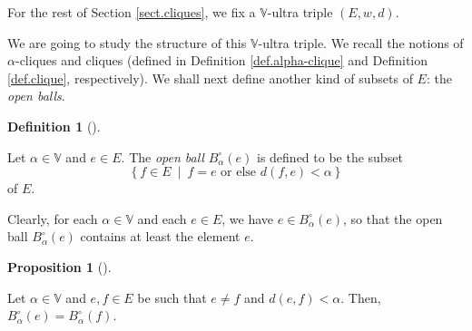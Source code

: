 \documentclass[numbers=enddot,12pt,final,onecolumn,notitlepage]{scrartcl}%
\theoremstyle{definition}
\newtheorem{prop}[theo]{Proposition}
\newenvironment{proposition}[1][]
{\begin{prop}[#1]\begin{leftbar}}
{\end{leftbar}\end{prop}}
\newtheorem{defi}[theo]{Definition}
\newenvironment{definition}[1][]
{\begin{defi}[#1]\begin{leftbar}}
{\end{leftbar}\end{defi}}
\theoremstyle{plainsl}
\begin{document}
For the rest of Section \ref{sect.cliques}, we fix a $\mathbb{V}$-ultra triple
$\left(  E,w,d\right)  $.

We are going to study the structure of this $\mathbb{V}$-ultra triple. We
recall the notions of $\alpha$-cliques and cliques (defined in Definition
\ref{def.alpha-clique} and Definition \ref{def.clique}, respectively). We
shall next define another kind of subsets of $E$: the \textit{open balls}.

\begin{definition}
\label{def.open-ball}Let $\alpha\in\mathbb{V}$ and $e\in E$. The \textit{open
ball }$B_{\alpha}^{\circ}\left(  e\right)  $ is defined to be the subset%
\[
\left\{  f\in E\ \mid\ f=e\text{ or else }d\left(  f,e\right)  <\alpha
\right\}
\]
of $E$.
\end{definition}

Clearly, for each $\alpha\in\mathbb{V}$ and each $e\in E$, we have $e\in
B_{\alpha}^{\circ}\left(  e\right)  $, so that the open ball $B_{\alpha
}^{\circ}\left(  e\right)  $ contains at least the element $e$.

\begin{proposition}
\label{prop.Bo.self-rad}Let $\alpha\in\mathbb{V}$ and $e,f\in E$ be such that
$e\neq f$ and $d\left(  e,f\right)  <\alpha$. Then, $B_{\alpha}^{\circ}\left(
e\right)  =B_{\alpha}^{\circ}\left(  f\right)  $.
\end{proposition}
\end{document}
